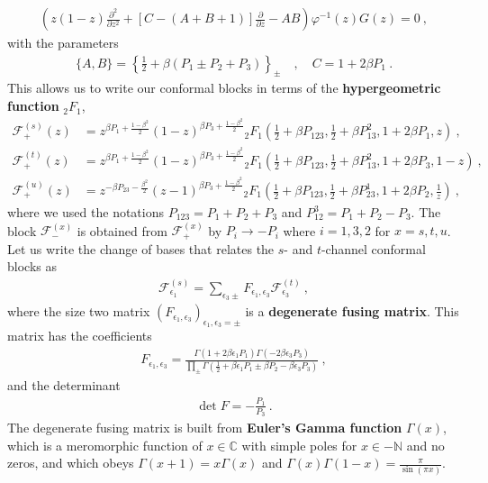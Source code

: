 \documentclass[12pt, a4paper]{article}
\theoremstyle{break}
\begin{document}
\begin{align}
 \left(z(1-z)\frac{\partial^2}{\partial z^2} + \left[C-(A+B+1)\right]\frac{\partial}{\partial z} -AB\right) \varphi^{-1}(z) G(z) = 0 \ , 
\end{align}
with the parameters 
\begin{align}
 \{A,B\} = \left\{\tfrac12+\beta(P_1\pm P_2+P_3)\right\}_\pm \quad , \quad  C=1+2\beta P_1\ .
\end{align}
This allows us to write our conformal blocks in terms of the \textbf{hypergeometric function} ${}_2F_1$,
\begin{align}
 \mathcal{F}_+^{(s)}(z) &= z^{\beta P_1 +\frac{1-\beta^2}{2}}(1-z)^{\beta P_3 + \frac{1-\beta^2}{2}} {}_2F_1\left(\tfrac12+ \beta P_{123},\tfrac12+\beta P_{13}^2,1+2\beta P_1,z\right) \ , 
 \\
 \mathcal{F}_+^{(t)}(z) &= z^{\beta P_1 +\frac{1-\beta^2}{2}}(1-z)^{\beta P_3 + \frac{1-\beta^2}{2}} {}_2F_1\left(\tfrac12+ \beta P_{123},\tfrac12+\beta P_{13}^2,1+2\beta P_3,1-z\right) \ , 
 \\
 \mathcal{F}_+^{(u)}(z) &= z^{-\beta P_{23} -\frac{\beta^2}{2}}(z-1)^{\beta P_3 + \frac{1-\beta^2}{2}} {}_2F_1\left(\tfrac12+ \beta P_{123},\tfrac12+\beta P_{23}^1,1+2\beta P_2,\tfrac{1}{z}\right) \ , 
\end{align}
where we used the notations $P_{123}=P_1+P_2+P_3$ and $P_{12}^3 = P_1+P_2-P_3$. The block $\mathcal{F}^{(x)}_-$ is obtained from $\mathcal{F}^{(x)}_+$ by $P_i\to -P_i$ where $i=1,3,2$ for $x=s,t,u$. 
Let us write 
the change of bases that relates the $s$- and $t$-channel conformal blocks as 
\begin{align}
 \mathcal{F}^{(s)}_{\epsilon_1} = \sum_{\epsilon_3\pm} F_{\epsilon_1,\epsilon_3} \mathcal{F}^{(t)}_{\epsilon_3}\ , 
 \label{fsfft}
\end{align}
where the size two matrix $\left(F_{\epsilon_1,\epsilon_3}\right)_{\epsilon_1,\epsilon_3=\pm}$ is a \textbf{degenerate fusing matrix}. This matrix has the coefficients 
\begin{align}
 \boxed{F_{\epsilon_1,\epsilon_3} = \frac{\Gamma(1+2\beta\epsilon_1P_1)\Gamma(-2\beta \epsilon_3P_3)}{\prod_\pm \Gamma(\frac12 +\beta \epsilon_1P_1 \pm \beta P_2 -\beta \epsilon_3P_3)}}\ ,
 \label{fee}
\end{align}
and the determinant 
\begin{align}
 \det F = -\frac{P_1}{P_3}\ .
 \label{detf}
\end{align}
The degenerate fusing matrix is built from \textbf{Euler's Gamma function} $\Gamma(x)$, which is a meromorphic function of $x\in\mathbb{C}$ with simple poles for $x\in -\mathbb{N}$ and no zeros, and which obeys $\Gamma(x+1)=x\Gamma(x)$ and $\Gamma(x)\Gamma(1-x)=\frac{\pi}{\sin(\pi x)}$. 
\end{document}
